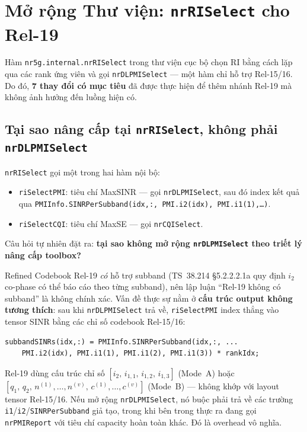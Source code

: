 \documentclass[11pt,a4paper]{article}
\begin{document}
\FloatBarrier
\section{Mở rộng Thư viện: \texttt{nrRISelect} cho Rel-19}

Hàm \texttt{nr5g.internal.nrRISelect} trong thư viện cục bộ chọn RI bằng cách
lặp qua các rank ứng viên và gọi \texttt{nrDLPMISelect} --- một hàm chỉ hỗ trợ
Rel-15/16. Do đó, \textbf{7 thay đổi có mục tiêu} đã được thực hiện để thêm
nhánh Rel-19 mà không ảnh hưởng đến luồng hiện có.

\subsection{Tại sao nâng cấp tại \texttt{nrRISelect}, không phải \texttt{nrDLPMISelect}}

\texttt{nrRISelect} gọi một trong hai hàm nội bộ:
\begin{itemize}[noitemsep]
  \item \texttt{riSelectPMI}: tiêu chí MaxSINR --- gọi \texttt{nrDLPMISelect}, sau đó
        index kết quả qua \texttt{PMIInfo.SINRPerSubband(idx,:,\,PMI.i2(idx),\,PMI.i1(1),\ldots)}.
  \item \texttt{riSelectCQI}: tiêu chí MaxSE --- gọi \texttt{nrCQISelect}.
\end{itemize}

Câu hỏi tự nhiên đặt ra: \textbf{tại sao không mở rộng \texttt{nrDLPMISelect} theo
triết lý nâng cấp toolbox?}

Refined Codebook Rel-19 \emph{có} hỗ trợ subband (TS~38.214 \S5.2.2.2.1a quy định
$i_2$ co-phase có thể báo cáo theo từng subband), nên lập luận ``Rel-19 không có
subband'' là không chính xác. Vấn đề thực sự nằm ở \textbf{cấu trúc output
không tương thích}: sau khi \texttt{nrDLPMISelect} trả về, \texttt{riSelectPMI}
index thẳng vào tensor SINR bằng các chỉ số codebook Rel-15/16:
\begin{lstlisting}[style=matlab]
% riSelectPMI, dong ~439
subbandSINRs(idx,:) = PMIInfo.SINRPerSubband(idx,:, ...
    PMI.i2(idx), PMI.i1(1), PMI.i1(2), PMI.i1(3)) * rankIdx;
\end{lstlisting}
Rel-19 dùng cấu trúc chỉ số $[i_2,\,i_{1,1},\,i_{1,2},\,i_{1,3}]$ (Mode~A)
hoặc $[q_1,\,q_2,\,n^{(1)},\ldots,n^{(v)},\,c^{(1)},\ldots,c^{(v)}]$ (Mode~B)
--- không khớp với layout tensor Rel-15/16. Nếu mở rộng \texttt{nrDLPMISelect},
nó buộc phải trả về các trường \texttt{i1}/\texttt{i2}/\texttt{SINRPerSubband}
giả tạo, trong khi bên trong thực ra đang gọi \texttt{nrPMIReport} với tiêu chí
capacity hoàn toàn khác. Đó là overhead vô nghĩa.
\end{document}
